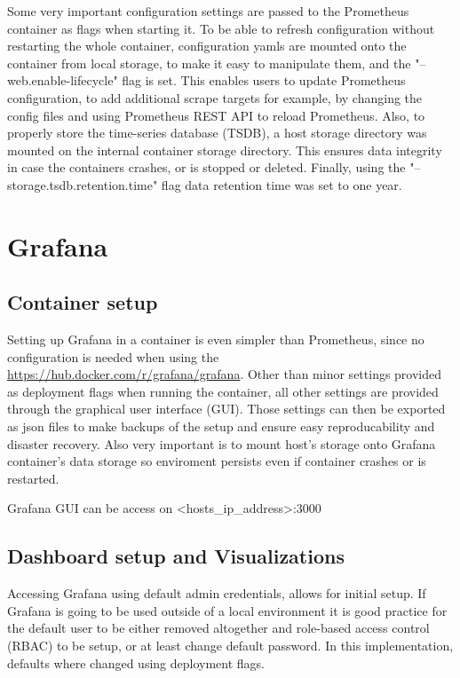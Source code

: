 Some very important configuration settings are passed to the Prometheus container as flags when starting it. To be able to refresh configuration without restarting the whole container, configuration yamls are mounted onto the container from local storage, to make it easy to manipulate them, and the "--web.enable-lifecycle" flag is set. This enables users to update Prometheus configuration, to add additional scrape targets for example, by changing the config files and using Prometheus REST API to reload Prometheus. Also, to properly store the time-series database (TSDB), a host storage directory was mounted on the internal container storage directory. This ensures data integrity in case the containers crashes, or is stopped or deleted. Finally, using the "--storage.tsdb.retention.time" flag data retention time was set to one year.

\section{Grafana}
\subsection{Container setup}
Setting up Grafana in a container is even simpler than Prometheus, since no configuration is needed when using the \href{official Grafana docker image}{https://hub.docker.com/r/grafana/grafana}.
Other than minor settings provided as deployment flags when running the container, all other settings are provided through the graphical user interface (GUI). Those settings can then be exported as json files to make backups of the setup and ensure easy reproducability and disaster recovery.
Also very important is to mount host's storage onto Grafana container's data storage so enviroment persists even if container crashes or is restarted.

Grafana GUI can be access on <hosts\_ip\_address>:3000

\subsection{Dashboard setup and Visualizations}
Accessing Grafana using default admin credentials, allows for initial setup. If Grafana is going to be used outside of a local environment it is good practice for the default user to be either removed altogether and role-based access control (RBAC) to be setup, or at least change default password. In this implementation, defaults where changed using deployment flags.

